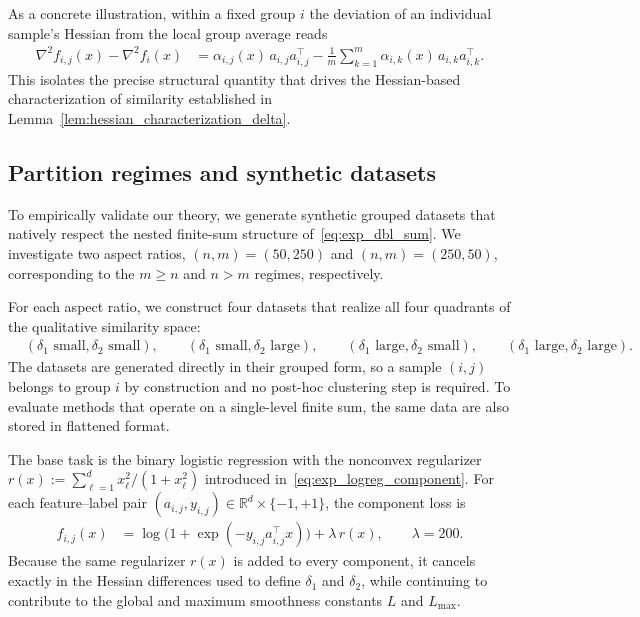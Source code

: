 \documentclass{article}
\newcommand{\bb}{\mathbb}
\newcommand{\R}{\bb R}
\newcommand{\eqdef}{:=}
\theoremstyle{plain}
\begin{document}
As a concrete illustration, within a fixed group $i$ the deviation of an individual sample's Hessian from the local group average reads
\begin{align}
\label{eq:exp_within_group_hess_diff}
\nabla^2 f_{i,j}(x)-\nabla^2 f_i(x)
&= \alpha_{i,j}(x)\,a_{i,j}a_{i,j}^\top
-\frac{1}{m}\sum_{k=1}^m \alpha_{i,k}(x)\,a_{i,k}a_{i,k}^\top.
\end{align}
This isolates the precise structural quantity that drives the Hessian-based characterization of similarity established in Lemma~\ref{lem:hessian_characterization_delta}.

\subsection{Partition regimes and synthetic datasets}
\label{subsec:partition-regimes}

To empirically validate our theory, we generate synthetic grouped datasets that natively respect the nested finite-sum structure of~\eqref{eq:exp_dbl_sum}. We investigate two aspect ratios, $(n,m)=(50,250)$ and $(n,m)=(250,50)$, corresponding to the $m\ge n$ and $n>m$ regimes, respectively.

For each aspect ratio, we construct four datasets that realize all four quadrants of the qualitative similarity space:
\begin{align*}
    &(\delta_1 \text{ small}, \delta_2 \text{ small}),\qquad
    (\delta_1 \text{ small}, \delta_2 \text{ large}),\qquad
    (\delta_1 \text{ large}, \delta_2 \text{ small}),\qquad
    (\delta_1 \text{ large}, \delta_2 \text{ large}).
\end{align*}
The datasets are generated directly in their grouped form, so a sample $(i,j)$ belongs to group $i$ by construction and no post-hoc clustering step is required. To evaluate methods that operate on a single-level finite sum, the same data are also stored in flattened format.

The base task is the binary logistic regression with the nonconvex regularizer $r(x) \eqdef \sum_{\ell=1}^d x_\ell^2 / (1+x_\ell^2)$ introduced in~\eqref{eq:exp_logreg_component}. For each feature--label pair $(a_{i,j},y_{i,j})\in \R^d\times\{-1,+1\}$, the component loss is
\begin{align*}
    f_{i,j}(x)
    &=
    \log\bigl(1+\exp(-y_{i,j}a_{i,j}^{\top}x)\bigr)
    +
    \lambda\, r(x),
    \qquad \lambda=200.
\end{align*}
Because the same regularizer $r(x)$ is added to every component, it cancels exactly in the Hessian differences used to define $\delta_1$ and $\delta_2$, while continuing to contribute to the global and maximum smoothness constants $L$ and $L_{\max}$.
\end{document}
